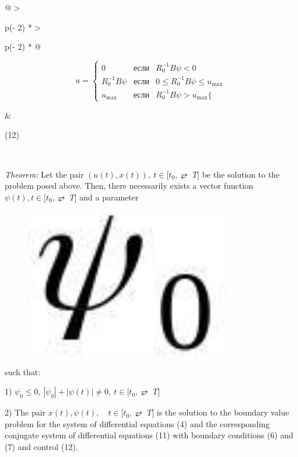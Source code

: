 \begin{longtable}[]{@{}
  >{\raggedright\arraybackslash}p{(\columnwidth - 2\tabcolsep) * }
  >{\raggedright\arraybackslash}p{(\columnwidth - 2\tabcolsep) * }@{}}
\toprule\noalign{}
\begin{minipage}[b]{\linewidth}\raggedright
\[u = \left\{ \begin{matrix}
0 & если & R_{0}^{- 1}B\psi < 0 \\
R_{0}^{- 1}B\psi & если & 0 \leq R_{0}^{- 1}B\psi \leq u_{\max} \\
u_{\max} & если & R_{0}^{- 1}B\psi > u_{\max}\{
\end{matrix} \right.\ \]
\end{minipage} & \begin{minipage}[b]{\linewidth}\raggedright
(12)
\end{minipage} \\
\midrule\noalign{}
\endhead
\bottomrule\noalign{}
\endlastfoot
\end{longtable}

\emph{Theorem:} Let the pair
\(\left( u(t),x(t) \right),\ t \in \lbrack t_{0}, ⥂ \mspace{6mu} T\rbrack\)
be the solution to the problem posed above. Then, there necessarily
exists a vector function
\(\psi(t),t \in \lbrack t_{0}, ⥂ \mspace{6mu} T\rbrack\) and a parameter
\begin{figure}[H]
	\centering
	\includegraphics[width=0.8\textwidth]{assets/149}
	\caption*{}
\end{figure} such that:

1) \(\psi_{0} \leq 0\),
\(\left| \psi_{0} \right| + \left| \psi(t) \right| \neq 0,\ t \in \lbrack t_{0}, ⥂ \mspace{6mu} T\rbrack\)

2) The pair
\(x(t),\psi(t),\quad t \in \lbrack t_{0}, ⥂ \mspace{6mu} T\rbrack\) is
the solution to the boundary value problem for the system of
differential equations (4) and the corresponding conjugate system of
differential equations (11) with boundary conditions (6) and (7) and
control (12).

